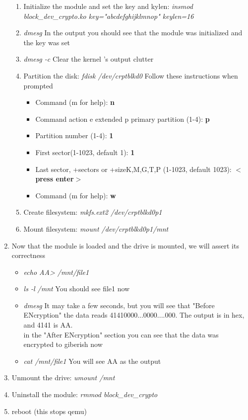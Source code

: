 \documentclass[draftclsnofoot, onecolumn, 10pt, compsoc]{IEEEtran}
\begin{document}
\begin{enumerate}
\begin{enumerate}
					\item Initialize the module and set the key and kylen: \textit{insmod block\_dev\_crypto.ko key="abcdefghijklmnop" keylen=16}
					\item \textit{dmesg} In the output you should see that the module was initialized and the key was set
					\item \textit{dmesg -c} Clear the kernel 's output clutter
					\item Partition the disk:\textit{ fdisk /dev/crptblkd0}
						Follow these instructions when prompted
						\begin{itemize}
							\item Command (m for help): \textbf{n}
							\item Command action
   e extended
   p primary partition (1-4):
\textbf{p}
							\item Partition number (1-4): \textbf{1}
							\item First sector(1-1023, default 1): \textbf{1}
							\item Last sector, +sectors or +size{K,M,G,T,P} (1-1023, default 1023): \textbf{$<$press enter$>$}
							\item Command (m for help): \textbf{w}
						\end{itemize}
					\item Create filesystem: \textit{mkfs.ext2 /dev/crptblkd0p1}
					\item Mount filesystem: \textit{mount /dev/crptblkd0p1/mnt}
				\end{enumerate}
				\item Now that the module is loaded and the drive is mounted, we will assert its correctness
				\begin{itemize}
					\item \textit{echo AA> /mnt/file1}
					\item \textit{ls -l /mnt} You should see file1 now
					\item \textit{dmesg} It may take a few seconds, but you will see that "Before ENcryption" the data reads 41410000...0000....000. The output is in hex, and 4141 is AA. \\
					in the "After ENcryption" section you can see that the data was encrypted to giberish now
					\item \textit{cat /mnt/file1} You will see AA as the output
				\end{itemize}
				\item Unmount the drive: \textit{umount /mnt}
				\item Uninstall the module: \textit{rmmod block\_dev\_crypto}
				\item reboot (this stops qemu)
			\end{enumerate}
\end{document}
